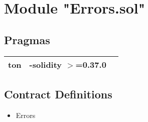 
\section{Module "Errors.sol"}


\subsection{Pragmas}


\noindent\begin{tabular}{|l|l|p{5cm}|}\hline
ton & -solidity $>$=0.37.0 &\\\hline
\end{tabular}


\subsection{Contract Definitions}

\begin{itemize}
\item Errors
\end{itemize}
